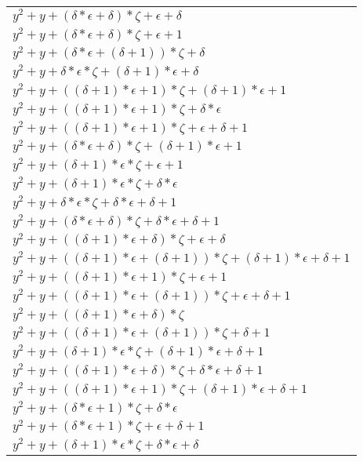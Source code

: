 \documentclass[12pt]{article}
\begin{document}
\begin{center}
\begin{longtable}{|l|}
	$y^2 + y + (\delta*\epsilon + \delta)*\zeta + \epsilon + \delta$ \\
	$y^2 + y + (\delta*\epsilon + \delta)*\zeta + \epsilon + 1$ \\
	$y^2 + y + (\delta*\epsilon + (\delta + 1))*\zeta + \delta$ \\
	$y^2 + y + \delta*\epsilon*\zeta + (\delta + 1)*\epsilon + \delta$ \\
	$y^2 + y + ((\delta + 1)*\epsilon + 1)*\zeta + (\delta + 1)*\epsilon + 1$ \\
	$y^2 + y + ((\delta + 1)*\epsilon + 1)*\zeta + \delta*\epsilon$ \\
	$y^2 + y + ((\delta + 1)*\epsilon + 1)*\zeta + \epsilon + \delta + 1$ \\
	$y^2 + y + (\delta*\epsilon + \delta)*\zeta + (\delta + 1)*\epsilon + 1$ \\
	$y^2 + y + (\delta + 1)*\epsilon*\zeta + \epsilon + 1$ \\
	$y^2 + y + (\delta + 1)*\epsilon*\zeta + \delta*\epsilon$ \\
	$y^2 + y + \delta*\epsilon*\zeta + \delta*\epsilon + \delta + 1$ \\
	$y^2 + y + (\delta*\epsilon + \delta)*\zeta + \delta*\epsilon + \delta + 1$ \\
	$y^2 + y + ((\delta + 1)*\epsilon + \delta)*\zeta + \epsilon + \delta$ \\
	$y^2 + y + ((\delta + 1)*\epsilon + (\delta + 1))*\zeta + (\delta + 1)*\epsilon + \delta + 1$ \\
	$y^2 + y + ((\delta + 1)*\epsilon + 1)*\zeta + \epsilon + 1$ \\
	$y^2 + y + ((\delta + 1)*\epsilon + (\delta + 1))*\zeta + \epsilon + \delta + 1$ \\
	$y^2 + y + ((\delta + 1)*\epsilon + \delta)*\zeta$ \\
	$y^2 + y + ((\delta + 1)*\epsilon + (\delta + 1))*\zeta + \delta + 1$ \\
	$y^2 + y + (\delta + 1)*\epsilon*\zeta + (\delta + 1)*\epsilon + \delta + 1$ \\
	$y^2 + y + ((\delta + 1)*\epsilon + \delta)*\zeta + \delta*\epsilon + \delta + 1$ \\
	$y^2 + y + ((\delta + 1)*\epsilon + 1)*\zeta + (\delta + 1)*\epsilon + \delta + 1$ \\
	$y^2 + y + (\delta*\epsilon + 1)*\zeta + \delta*\epsilon$ \\
	$y^2 + y + (\delta*\epsilon + 1)*\zeta + \epsilon + \delta + 1$ \\
	$y^2 + y + (\delta + 1)*\epsilon*\zeta + \delta*\epsilon + \delta$ \\

\end{longtable}
\end{center}
\end{document}
